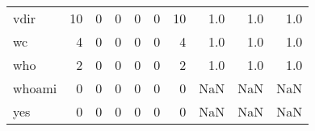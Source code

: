 \begin{tabular}{lrrrrrrrrr}
vdir      &                                                 10 &                                                  0 &                                                  0 &                                                  0 &                                                  0 &                                                 10 &                                                1.0 &                                    1.0 &                                  1.0 \\
wc        &                                                  4 &                                                  0 &                                                  0 &                                                  0 &                                                  0 &                                                  4 &                                                1.0 &                                    1.0 &                                  1.0 \\
who       &                                                  2 &                                                  0 &                                                  0 &                                                  0 &                                                  0 &                                                  2 &                                                1.0 &                                    1.0 &                                  1.0 \\
whoami    &                                                  0 &                                                  0 &                                                  0 &                                                  0 &                                                  0 &                                                  0 &                                                NaN &                                    NaN &                                  NaN \\
yes       &                                                  0 &                                                  0 &                                                  0 &                                                  0 &                                                  0 &                                                  0 &                                                NaN &                                    NaN &                                  NaN \\
\bottomrule
\end{tabular}
